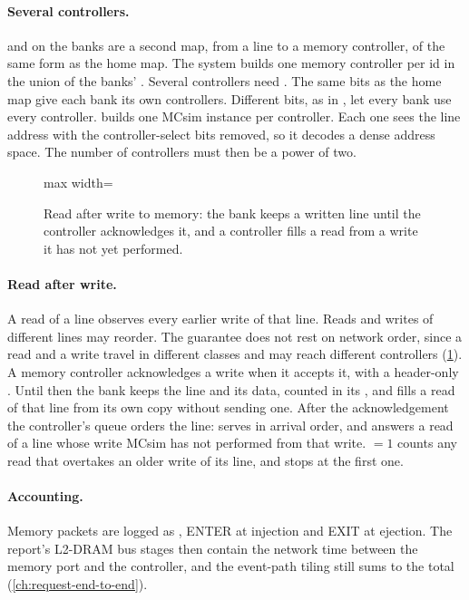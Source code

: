 \paragraph{Several controllers.}  and  on the
banks are a second map, from a line to a memory controller, of the same form as the home map. The
system builds one memory controller per id in the union of the banks' . Several
controllers need . The same bits as the home map give each bank its own
controllers. Different bits, as in , let every bank use every controller.
 builds one MCsim instance per controller. Each one sees the line
address with the controller-select bits removed, so it decodes a dense address space. The number of
controllers must then be a power of two.

\begin{figure}[htbp]\centering
\begin{adjustbox}{max width=\textwidth}\end{adjustbox}
\caption{Read after write to memory: the bank keeps a written line until the controller
acknowledges it, and a controller fills a read from a write it has not yet performed.}
\label{fig:noc-raw}
\end{figure}

\paragraph{Read after write.} A read of a line observes every earlier write of that line. Reads
and writes of different lines may reorder. The guarantee does not rest on network order, since a
read and a write travel in different classes and may reach different controllers
(\cref{fig:noc-raw}). A memory controller acknowledges a write when it accepts it, with a
header-only . Until then the bank keeps the line and its data, counted in its
, and fills a read of that line from its own copy without sending one. After the
acknowledgement the controller's queue orders the line:  serves in
arrival order, and  answers a read of a line whose write MCsim has not
performed from that write. $=1$ counts any read that overtakes an older
write of its line, and  stops at the first one.

\paragraph{Accounting.} Memory packets are logged as , ENTER at injection and EXIT
at ejection. The report's L2-DRAM bus stages then contain the network time between the memory port
and the controller, and the event-path tiling still sums to the total
(\cref{ch:request-end-to-end}).

